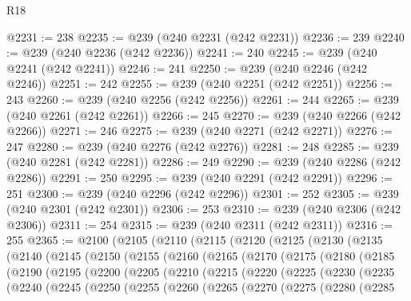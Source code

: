 \begin{lexlean}{R18}
\begin{coremodule}
@2231 := 238
@2235 := @239 (@240 @2231 (@242 @2231))
@2236 := 239
@2240 := @239 (@240 @2236 (@242 @2236))
@2241 := 240
@2245 := @239 (@240 @2241 (@242 @2241))
@2246 := 241
@2250 := @239 (@240 @2246 (@242 @2246))
@2251 := 242
@2255 := @239 (@240 @2251 (@242 @2251))
@2256 := 243
@2260 := @239 (@240 @2256 (@242 @2256))
@2261 := 244
@2265 := @239 (@240 @2261 (@242 @2261))
@2266 := 245
@2270 := @239 (@240 @2266 (@242 @2266))
@2271 := 246
@2275 := @239 (@240 @2271 (@242 @2271))
@2276 := 247
@2280 := @239 (@240 @2276 (@242 @2276))
@2281 := 248
@2285 := @239 (@240 @2281 (@242 @2281))
@2286 := 249
@2290 := @239 (@240 @2286 (@242 @2286))
@2291 := 250
@2295 := @239 (@240 @2291 (@242 @2291))
@2296 := 251
@2300 := @239 (@240 @2296 (@242 @2296))
@2301 := 252
@2305 := @239 (@240 @2301 (@242 @2301))
@2306 := 253
@2310 := @239 (@240 @2306 (@242 @2306))
@2311 := 254
@2315 := @239 (@240 @2311 (@242 @2311))
@2316 := 255
@2365 := @2100
    (@2105
      (@2110
        (@2115
          (@2120
            (@2125
              (@2130
                (@2135
                  (@2140
                    (@2145
                      (@2150
                        (@2155
                          (@2160
                            (@2165
                              (@2170
                                (@2175
                                  (@2180
                                    (@2185
                                      (@2190
                                        (@2195
                                          (@2200
                                            (@2205
                                              (@2210
                                                (@2215
                                                  (@2220
                                                    (@2225
                                                      (@2230
                                                        (@2235
                                                          (@2240
                                                            (@2245
                                                              (@2250
                                                                (@2255
                                                                  (@2260
                                                                    (@2265
                                                                      (@2270
                                                                        (@2275
                                                                          (@2280
                                                                            (@2285

\end{coremodule}
\end{lexlean}
